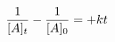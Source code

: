 \documentclass[preview]{standalone}
\begin{document}
\begin{align*}
\special{dvisvgm:raw <g id='unique000'>}\frac{1}{[A]_t} - \frac{1}{[A]_0} = +kt\special{dvisvgm:raw </g>}
\end{align*}
\end{document}
